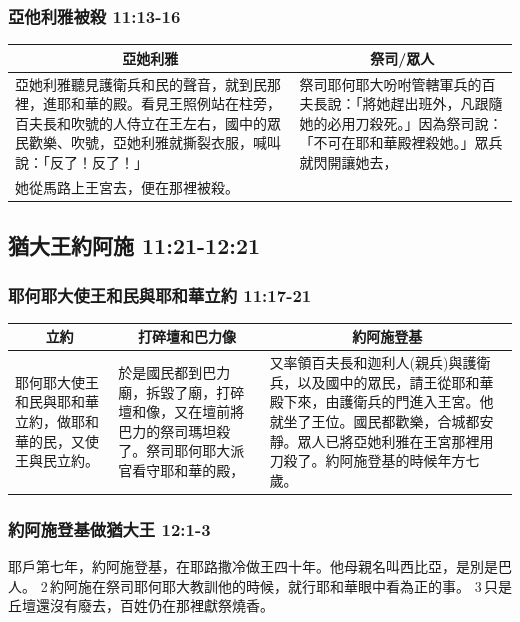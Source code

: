 \subsubsection{亞他利雅被殺 11:13-16}
\begin{table}[H]
\hspace{-5mm}
\centering
\begin{tabular}{p{9.75cm}|p{7.75cm}}\hline
\multicolumn{1}{c}{亞她利雅}&\multicolumn{1}{c}{祭司/眾人}\\\hline
亞她利雅聽見護衛兵和民的聲音，就到民那裡，進耶和華的殿。看見王照例站在柱旁，百夫長和吹號的人侍立在王左右，國中的眾民歡樂、吹號，亞她利雅就撕裂衣服，喊叫說：「反了！反了！」&祭司耶何耶大吩咐管轄軍兵的百夫長說：「將她趕出班外，凡跟隨她的必用刀殺死。」因為祭司說：「不可在耶和華殿裡殺她。」眾兵就閃開讓她去，\\\hline
她從馬路上王宮去，便在那裡被殺。&\\\hline
\end{tabular}
\end{table}





\subsection{猶大王約阿施 11:21-12:21 }
\subsubsection{耶何耶大使王和民與耶和華立約 11:17-21 }
\begin{table}[H]
\hspace{-5mm}
\centering
\begin{tabular}{p{}|p{5.5cm}|p{8.5cm}}\hline
\multicolumn{1}{c}{立約}&\multicolumn{1}{c}{打碎壇和巴力像}&\multicolumn{1}{c}{約阿施登基}\\\hline
耶何耶大使王和民與耶和華立約，做耶和華的民，又使王與民立約。&於是國民都到巴力廟，拆毀了廟，打碎壇和像，又在壇前將巴力的祭司瑪坦殺了。祭司耶何耶大派官看守耶和華的殿，&又率領百夫長和迦利人(親兵)與護衛兵，以及國中的眾民，請王從耶和華殿下來，由護衛兵的門進入王宮。他就坐了王位。國民都歡樂，合城都安靜。眾人已將亞她利雅在王宮那裡用刀殺了。約阿施登基的時候年方七歲。\\\hline
\end{tabular}
\end{table}

\subsubsection{約阿施登基做猶大王 12:1-3 }
耶戶第七年，約阿施登基，在耶路撒冷做王四十年。他母親名叫西比亞，是別是巴人。 2 約阿施在祭司耶何耶大教訓他的時候，就行耶和華眼中看為正的事。 3 只是丘壇還沒有廢去，百姓仍在那裡獻祭燒香。

